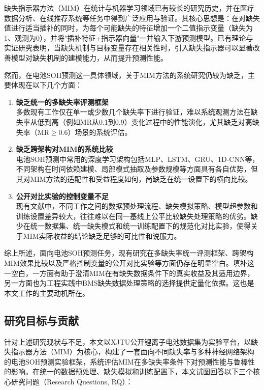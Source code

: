 \documentclass[10pt,a4paper]{ctexart}
\begin{document}
缺失指示器方法（MIM）在统计与机器学习领域已有较长的研究历史，并在医疗数据分析、在线推荐系统等任务中得到广泛应用与验证\cite{jones1996indicator,van2023missing}。其核心思想是：在对缺失值进行适当插补的同时，为每个可能缺失的特征增加一个二值指示变量（缺失为1、观测为0），并将"插补特征+指示器向量"一并输入下游预测模型。已有理论与实证研究表明，当缺失机制与目标变量存在相关性时，引入缺失指示器可以显著改善模型对缺失机制的建模能力，从而提升预测性能\cite{sisk2023imputation,ehrig2025imputation}。

然而，在电池SOH预测这一具体领域，关于MIM方法的系统研究仍较为缺乏，主要体现在以下几个方面：

\begin{enumerate}[label=(\arabic*)]
    \item \textbf{缺乏统一的多缺失率评测框架}\\
    多数现有工作仅在单一或少数几个缺失率下进行验证，难以系统观测方法在缺失率从低到高（例如MR从0.1到0.9）变化过程中的性能演化，尤其缺乏对高缺失率（MR$\geq 0.6$）场景的系统评估。
    
    \item \textbf{缺乏跨架构对MIM的系统比较}\\
    电池SOH预测中常用的深度学习架构包括MLP、LSTM、GRU、1D-CNN等，不同架构在时间依赖建模、局部模式抽取及参数规模等方面具有各自优势，但其对MIM方法的适配性和受益程度如何，尚缺乏在统一设置下的横向比较。
    
    \item \textbf{公开对比实验的控制变量不足}\\
    现有文献中，不同工作之间的数据预处理流程、缺失模拟策略、模型超参数和训练设置差异较大，往往难以在同一基线上公平比较缺失处理策略的优劣。缺少在统一数据集、统一缺失模式和统一训练配置下的规范化对比实验，使得关于MIM实际收益的结论缺乏足够的可比性和说服力。
\end{enumerate}

综上所述，面向电池SOH预测任务，现有研究在多缺失率统一评测框架、跨架构MIM效果比较以及严格控制变量的公开对比实验等方面仍存在明显空白。填补这一空白，一方面有助于澄清MIM在有缺失数据条件下的真实收益及其适用边界，另一方面也为工程实践中BMS缺失数据处理策略的选择提供定量化依据。这也是本文工作的主要动机所在。

\subsection{研究目标与贡献}

针对上述研究现状与不足，本文以XJTU公开锂离子电池数据集为实验平台，以缺失指示器方法（MIM）为核心，构建了一套面向不同缺失率与多种神经网络架构的电池SOH预测实验框架，系统评估MIM在多缺失率条件下对预测性能与鲁棒性的影响。在统一的数据预处理、缺失模拟和训练配置下，本文试图回答以下三个核心研究问题（Research Questions, RQ）：
\end{document}
